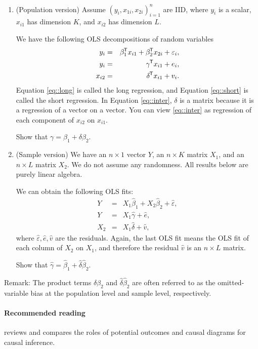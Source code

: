 \begin{enumerate}
[(1)]
\item
(Population version) Assume $(y_i, x_{1i}, x_{2i})_{i=1}^n$ are IID, where $y_i$ is a scalar, $x_{i1}$ has dimension $K$, and $x_{i2}$ has dimension $L$. 

We have the following OLS decompositions of random variables
\begin{eqnarray}
y_i &=& \beta_1 \tran x_{i1} + \beta_2  \tran x_{2i} + \varepsilon_i , \label{eq::long}\\
y_i&=&\gamma  \tran x_{i1} + e_i, \label{eq::short}\\
x_{i2} &=& \delta  \tran x_{i1} + v_i . \label{eq::inter}
\end{eqnarray}
Equation \eqref{eq::long} is called the long regression, and Equation \eqref{eq::short} is called the short regression. In Equation \eqref{eq::inter}, $\delta$ is a matrix because it is a regression of a vector on a vector. You can view \eqref{eq::inter} as regression of each component of $x_{i2}$ on $x_{i1}$. 

Show that $\gamma = \beta_1 + \delta \beta_2.$


\item
(Sample version) We have an $n\times 1$ vector $Y$, an $n\times K$ matrix $X_1$, and an $n\times L$ matrix $X_2$. We do not assume any randomness. All results below are purely linear algebra. 

We can obtain the following OLS fits: 
\begin{eqnarray*}
Y &=& X_1 \hat{\beta}_1 + X_2 \hat{\beta}_2+ \hat{\varepsilon},\\
Y &=& X_1 \hat{\gamma} + \hat{e} ,\\
X_2 &=& X_1 \hat{\delta} + \hat{v},
\end{eqnarray*}
where $\hat{\varepsilon},  \hat{e}, \hat{v}$ are the residuals. 
Again, the last OLS fit means the OLS fit of each column of $X_2$ on $X_1$, and therefore the residual $\hat{v}$ is an $n\times L$ matrix.

Show that $\hat{\gamma} = \hat{\beta}_1 +  \hat{\delta} \hat{\beta}_2$.

\end{enumerate}

 
Remark: The product terms  $\delta \beta_2$ and $\hat{\delta} \hat{\beta}_2$ are often referred to as the omitted-variable bias at the population level and sample level, respectively. 
 
 
 \paragraph{Recommended reading} 
 
\citet{imbens2020potential} reviews and compares the roles of potential outcomes and causal diagrams for causal inference. 



